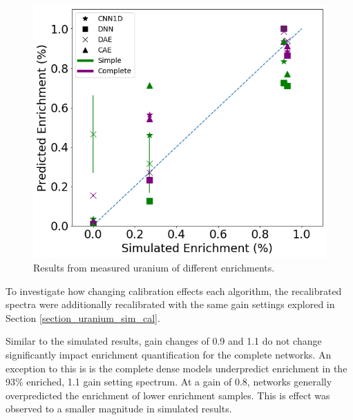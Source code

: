 \begin{figure}[H]
	\centering
	\includegraphics[width=0.8\linewidth]{images/measured_uranium.png}
	\caption{Results from measured uranium of different enrichments.}
	\label{fig:measured_uranium}
\end{figure}

To investigate how changing calibration effects each algorithm, the recalibrated spectra were additionally recalibrated with the same gain settings explored in Section \ref{section_uranium_sim_cal}. 

Similar to the simulated results, gain changes of 0.9 and 1.1 do not change significantly impact enrichment quantification for the complete networks. An exception to this is is the complete dense models underpredict enrichment in the 93\% enriched, 1.1 gain setting spectrum. At a gain of 0.8, networks generally overpredicted the enrichment of lower enrichment samples. This is effect was observed to a smaller magnitude in simulated results.

